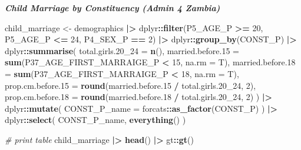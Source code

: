 \documentclass[
]{article}
\newenvironment{Shaded}{\begin{snugshade}}{\end{snugshade}}
\newcommand{\AttributeTok}[1]{\textcolor[rgb]{0.13,0.29,0.53}{#1}}
\newcommand{\CommentTok}[1]{\textcolor[rgb]{0.56,0.35,0.01}{\textit{#1}}}
\newcommand{\DecValTok}[1]{\textcolor[rgb]{0.00,0.00,0.81}{#1}}
\newcommand{\FloatTok}[1]{\textcolor[rgb]{0.00,0.00,0.81}{#1}}
\newcommand{\FunctionTok}[1]{\textcolor[rgb]{0.13,0.29,0.53}{\textbf{#1}}}
\newcommand{\NormalTok}[1]{#1}
\newcommand{\OtherTok}[1]{\textcolor[rgb]{0.56,0.35,0.01}{#1}}
\newcommand{\SpecialCharTok}[1]{\textcolor[rgb]{0.81,0.36,0.00}{\textbf{#1}}}
\newenvironment{UNFPAShadedBox}{%
\begin{tcolorbox}[sharp corners, enhanced, colback=white, boxrule=0pt, borderline west={2pt}{0pt}{orange}]%
}{\end{tcolorbox}}
\newenvironment{Highlighting}{\begin{UNFPAShadedBox}}{\end{UNFPAShadedBox}}
\begin{document}
\textbf{\emph{Child Marriage by Constituency (Admin 4 Zambia)}}

\begin{Shaded}
\begin{Highlighting}[]
\NormalTok{child\_marriage }\OtherTok{\textless{}{-}} 
\NormalTok{  demographics }\SpecialCharTok{|\textgreater{}}
\NormalTok{  dplyr}\SpecialCharTok{::}\FunctionTok{filter}\NormalTok{(P5\_AGE\_P }\SpecialCharTok{\textgreater{}=} \DecValTok{20}\NormalTok{, P5\_AGE\_P }\SpecialCharTok{\textless{}=} \DecValTok{24}\NormalTok{, P4\_SEX\_P }\SpecialCharTok{==} \DecValTok{2}\NormalTok{) }\SpecialCharTok{|\textgreater{}}
\NormalTok{  dplyr}\SpecialCharTok{::}\FunctionTok{group\_by}\NormalTok{(CONST\_P) }\SpecialCharTok{|\textgreater{}}
\NormalTok{  dplyr}\SpecialCharTok{::}\FunctionTok{summarise}\NormalTok{(}
    \AttributeTok{total.girls.20\_24 =} \FunctionTok{n}\NormalTok{(),}
    \AttributeTok{married.before.15 =} \FunctionTok{sum}\NormalTok{(P37\_AGE\_FIRST\_MARRAIGE\_P }\SpecialCharTok{\textless{}} \DecValTok{15}\NormalTok{, }\AttributeTok{na.rm =}\NormalTok{ T),}
    \AttributeTok{married.before.18 =} \FunctionTok{sum}\NormalTok{(P37\_AGE\_FIRST\_MARRAIGE\_P }\SpecialCharTok{\textless{}} \DecValTok{18}\NormalTok{, }\AttributeTok{na.rm =}\NormalTok{ T),}
    \AttributeTok{prop.cm.before.15 =} \FunctionTok{round}\NormalTok{(married.before}\FloatTok{.15} \SpecialCharTok{/}\NormalTok{ total.girls}\FloatTok{.20}\NormalTok{\_24, }\DecValTok{2}\NormalTok{),}
    \AttributeTok{prop.cm.before.18 =} \FunctionTok{round}\NormalTok{(married.before}\FloatTok{.18} \SpecialCharTok{/}\NormalTok{ total.girls}\FloatTok{.20}\NormalTok{\_24, }\DecValTok{2}\NormalTok{)}
\NormalTok{  ) }\SpecialCharTok{|\textgreater{}}
\NormalTok{  dplyr}\SpecialCharTok{::}\FunctionTok{mutate}\NormalTok{(}
    \AttributeTok{CONST\_P\_name =}\NormalTok{ forcats}\SpecialCharTok{::}\FunctionTok{as\_factor}\NormalTok{(CONST\_P)}
\NormalTok{  ) }\SpecialCharTok{|\textgreater{}}
\NormalTok{  dplyr}\SpecialCharTok{::}\FunctionTok{select}\NormalTok{(}
\NormalTok{    CONST\_P\_name,}
    \FunctionTok{everything}\NormalTok{()}
\NormalTok{  )}

\CommentTok{\# print table}
\NormalTok{child\_marriage }\SpecialCharTok{|\textgreater{}}
  \FunctionTok{head}\NormalTok{() }\SpecialCharTok{|\textgreater{}}
\NormalTok{  gt}\SpecialCharTok{::}\FunctionTok{gt}\NormalTok{()}
\end{Highlighting}
\end{Shaded}
\end{document}
